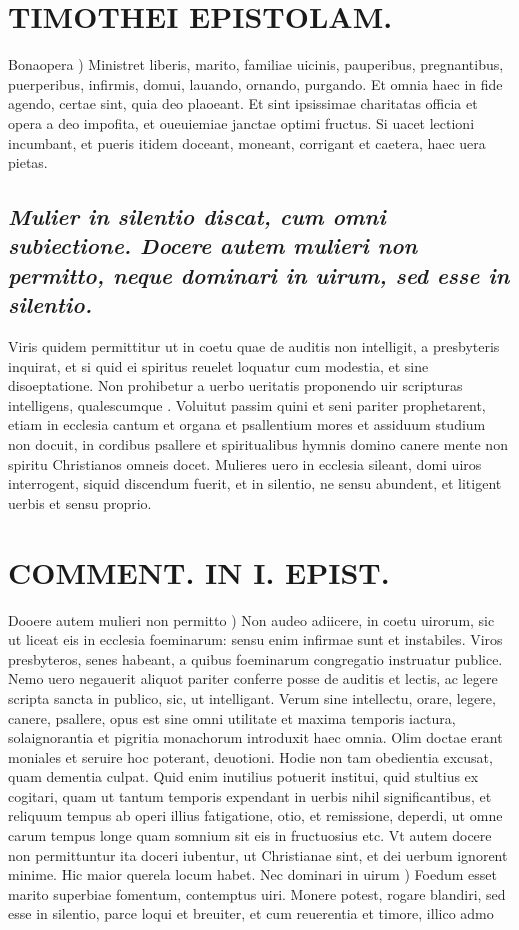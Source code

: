 \documentclass{article}
\begin{document}
\begin{pages}
\section*{TIMOTHEI EPISTOLAM. }
\marginpar{[ p.60 ]}\pstart Bonaopera ) Ministret liberis, marito, familiae uicinis, pauperibus, pregnantibus, puerperibus, infirmis, domui, lauando, ornando, purgando. Et omnia haec in fide agendo, certae sint, quia deo plaoeant. Et sint ipsissimae charitatas officia et opera a deo impofita, et oueuiemiae janctae optimi fructus. Si uacet lectioni incumbant, et pueris itidem doceant, moneant, corrigant et caetera, haec uera pietas.  \pend
{}
{}
\subsection*{\textit{Mulier in silentio discat, cum omni subiectione. Docere autem mulieri non permitto, neque dominari in uirum, sed esse in silentio. }}\pstart Viris quidem permittitur ut in coetu quae de auditis non intelligit, a presbyteris inquirat, et si quid ei spiritus reuelet loquatur cum modestia, et sine disoeptatione. Non prohibetur a uerbo ueritatis proponendo uir scripturas intelligens, qualescumque . Voluitut passim quini et seni pariter prophetarent, etiam in ecclesia cantum et organa et psallentium mores et assiduum studium non docuit, in cordibus psallere et spiritualibus hymnis domino canere mente non spiritu Christianos omneis docet. Mulieres uero in ecclesia sileant, domi uiros interrogent, siquid discendum fuerit, et in silentio, ne sensu abundent, et litigent uerbis et sensu proprio.  \pend
\section*{COMMENT. IN I. EPIST. }
\marginpar{[ p.61 ]}\pstart Dooere autem mulieri non permitto ) Non audeo adiicere, in coetu uirorum, sic ut liceat eis in ecclesia foeminarum: sensu enim infirmae sunt et instabiles. Viros presbyteros, senes habeant, a quibus foeminarum congregatio instruatur publice. Nemo uero negauerit aliquot pariter conferre posse de auditis et lectis, ac legere scripta sancta in publico, sic, ut intelligant. Verum sine intellectu, orare, legere, canere, psallere, opus est sine omni utilitate et maxima temporis iactura, solaignorantia et pigritia monachorum introduxit haec omnia. Olim doctae erant moniales et seruire hoc poterant, deuotioni. Hodie non tam obedientia excusat, quam dementia culpat. Quid enim inutilius potuerit institui, quid stultius ex cogitari, quam ut tantum temporis expendant in uerbis nihil significantibus, et reliquum tempus ab operi illius fatigatione, otio, et remissione, deperdi, ut omne carum tempus longe quam somnium sit eis in fructuosius etc. Vt autem docere non permittuntur ita doceri iubentur, ut Christianae sint, et dei uerbum ignorent minime. Hic maior querela locum habet.  \pend\pstart Nec dominari in uirum ) Foedum esset marito superbiae fomentum, contemptus uiri. Monere potest, rogare blandiri, sed esse in silentio, parce loqui et breuiter, et cum reuerentia et timore, illico admo\pend

\end{pages}
\end{document}
